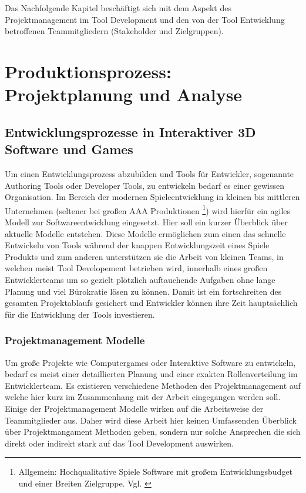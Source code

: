 \documentclass[pagesize, paper=a4, fontsize=12pt,titlepage=true, headings=small, headnosepline, abstractoff, liststotoc, nochapterprefix, plainheadsepline, twoside]{scrreprt}
\begin{document}
Das Nachfolgende Kapitel beschäftigt sich mit dem Aspekt des Projektmanagement im Tool Development und den von der Tool Entwicklung betroffenen Teammitgliedern (Stakeholder und Zielgruppen).

\chapter{Produktionsprozess: Projektplanung und Analyse}
\section{Entwicklungsprozesse in Interaktiver 3D Software und Games}
Um einen Entwicklungsprozess abzubilden und Tools für Entwickler, sogenannte Authoring Tools oder Developer Tools, zu entwickeln bedarf es einer gewissen Organisation. Im Bereich der modernen Spieleentwicklung in kleinen bis mittleren Unternehmen (seltener bei großen AAA Produktionen \footnote{Allgemein: Hochqualitative Spiele Software mit großem Entwicklungsbudget und einer Breiten Zielgruppe. Vgl. \cite{GamasutraAAA2005} }) wird hierfür ein agiles Modell zur Softwareentwicklung eingesetzt. Hier soll ein kurzer Überblick über aktuelle Modelle entstehen. Diese Modelle ermöglichen zum einen das schnelle Entwickeln von Tools während der knappen Entwicklungszeit eines Spiele Produkts und zum anderen unterstützen sie die Arbeit von kleinen Teams, in welchen meist Tool Developement betrieben wird,  innerhalb eines großen Entwicklerteams um so gezielt plötzlich auftauchende Aufgaben ohne lange Planung und viel Bürokratie lösen zu können. Damit ist ein fortschreiten des gesamten Projektablaufs gesichert und Entwickler können ihre Zeit hauptsächlich für die Entwicklung der Tools investieren.

\subsection{Projektmanagement Modelle}
Um große Projekte wie Computergames oder Interaktive Software zu entwickeln, bedarf es meist einer detaillierten Planung und einer exakten Rollenverteilung im Entwicklerteam. Es existieren verschiedene Methoden des Projektmanagement auf welche hier kurz im Zusammenhang mit der Arbeit eingegangen werden soll. Einige der Projektmanagement Modelle wirken auf die Arbeitsweise der Teammitglieder aus. Daher wird diese Arbeit hier keinen Umfassenden Überblick über Projektmangament Methoden geben, sondern nur solche Ansprechen die sich direkt oder indirekt stark auf das Tool Development auswirken.
\end{document}

